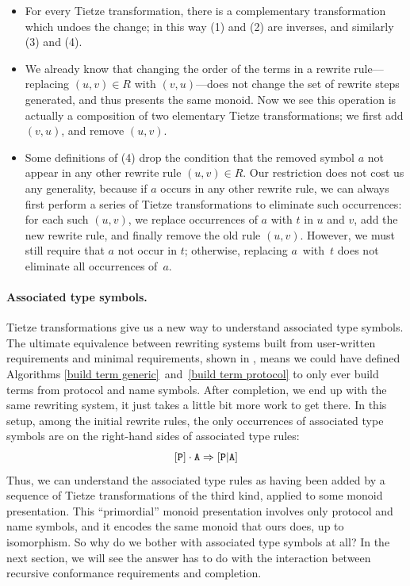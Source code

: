 \documentclass[../generics]{subfiles}
\begin{document}
\begin{itemize}
\item For every Tietze transformation, there is a complementary transformation which undoes the change; in this way (1) and (2) are inverses, and similarly (3) and (4).

\item We already know that changing the order of the terms in a rewrite rule---replacing $(u,v)\in R$ with $(v,u)$---does not change the set of rewrite steps generated, and thus presents the same monoid. Now we see this operation is actually a composition of two elementary Tietze transformations; we first add $(v,u)$, and remove $(u,v)$.

\item Some definitions of (4) drop the condition that the removed symbol $a$ not appear in any other rewrite rule $(u,v)\in R$. Our restriction does not cost us any generality, because if $a$ occurs in any other rewrite rule, we can always first perform a series of Tietze transformations to eliminate such occurrences: for each such $(u,v)$, we replace occurrences of $a$ with $t$ in $u$ and $v$, add the new rewrite rule, and finally remove the old rule $(u,v)$. However, we must still require that $a$ not occur in $t$; otherwise, replacing $a$~with~$t$ does not eliminate all occurrences of~$a$.
\end{itemize}

\paragraph{Associated type symbols.} Tietze transformations give us a new way to understand associated type symbols. The ultimate equivalence between rewriting systems built from user-written requirements and minimal requirements, shown in , means we could have defined Algorithms \ref{build term generic}~and~\ref{build term protocol} to only ever build terms from protocol and name symbols. After completion, we end up with the same rewriting system, it just takes a little bit more work to get there. In this setup, among the initial rewrite rules, the only occurrences of associated type symbols are on the right-hand sides of associated type rules:
\[[\texttt{P}]\cdot\texttt{A}\Rightarrow[\texttt{P}|\texttt{A}]\]
Thus, we can understand the associated type rules as having been added by a sequence of Tietze transformations of the third kind, applied to some monoid presentation. This ``primordial'' monoid presentation involves only protocol and name symbols, and it encodes the same monoid that ours does, up to isomorphism. So why do we bother with associated type symbols at all? In the next section, we will see the answer has to do with the interaction between recursive conformance requirements and completion.
\end{document}
